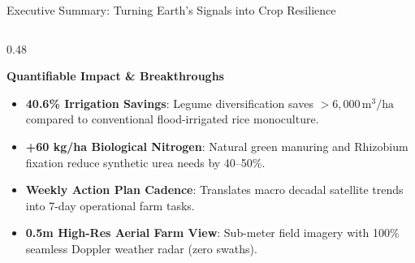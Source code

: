 \documentclass[aspectratio=169,10pt]{beamer}
\begin{document}
\begin{frame}{Executive Summary: Turning Earth's Signals into Crop Resilience}
\begin{columns}[T]
\begin{column}{0.48\textwidth}
\begin{exampleblock}{\textbf{Quantifiable Impact \& Breakthroughs}}
                \footnotesize
                \begin{itemize}
                    \item \textbf{40.6\% Irrigation Savings}: Legume diversification saves $>6,000\,\text{m}^3/\text{ha}$ compared to conventional flood-irrigated rice monoculture.
                    \item \textbf{+60 kg/ha Biological Nitrogen}: Natural green manuring and Rhizobium fixation reduce synthetic urea needs by 40--50\%.
                    \item \textbf{Weekly Action Plan Cadence}: Translates macro decadal satellite trends into 7-day operational farm tasks.
                    \item \textbf{0.5m High-Res Aerial Farm View}: Sub-meter field imagery with 100\% seamless Doppler weather radar (zero swaths).
                \end{itemize}
            \end{exampleblock}
        \end{column}
    \end{columns}
\end{frame}
\end{document}
